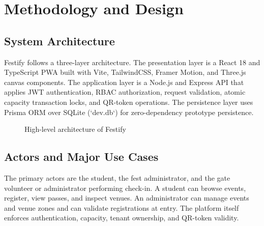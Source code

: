 \documentclass[11pt,a4paper]{report}
\begin{document}
\chapter{Methodology and Design}
\section{System Architecture}
Festify follows a three-layer architecture. The presentation layer is a React 18 and
TypeScript PWA built with Vite, TailwindCSS, Framer Motion, and Three.js canvas components.
The application layer is a Node.js and Express API that applies JWT authentication,
RBAC authorization, request validation, atomic capacity transaction locks, and QR-token operations.
The persistence layer uses Prisma ORM over SQLite (`dev.db`) for zero-dependency prototype persistence.

\begin{figure}[ht]
\centering
{}
\caption{High-level architecture of Festify}
\label{fig:architecture}
\end{figure}

\section{Actors and Major Use Cases}
The primary actors are the student, the fest administrator, and the gate volunteer or
administrator performing check-in. A student can browse events, register, view passes,
and inspect venues. An administrator can manage events and venue zones and can validate
registrations at entry. The platform itself enforces authentication, capacity, tenant
ownership, and QR-token validity.
\end{document}
